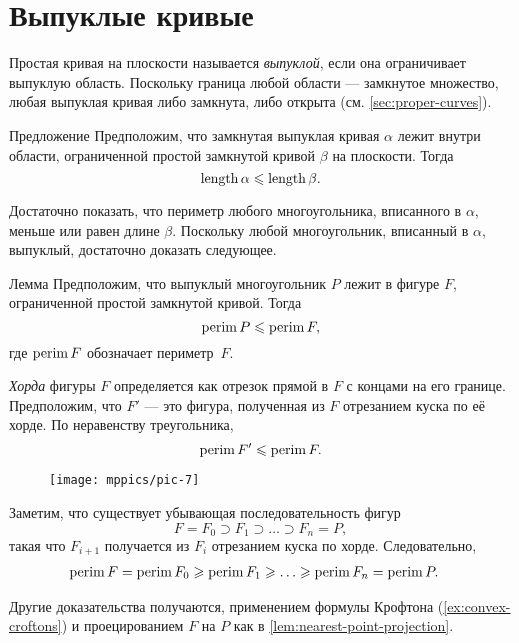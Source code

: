 \section{Выпуклые кривые}

Простая кривая на плоскости называется \emph{выпуклой}, если она ограничивает выпуклую область.
Поскольку граница любой области --- замкнутое множество, любая выпуклая кривая либо замкнута, либо открыта (см. \ref{sec:proper-curves}).

\begin{thm}{Предложение}\label{prop:convex-curve}
Предположим, что замкнутая выпуклая кривая $\alpha$ лежит внутри области, ограниченной простой замкнутой кривой $\beta$ на плоскости.
Тогда
\[\mathop{\rm length}\nolimits\alpha\leqslant \mathop{\rm length}\nolimits\beta.\]
\end{thm}

Достаточно показать, что периметр любого многоугольника, вписанного в $\alpha$, меньше или равен длине $\beta$.
Поскольку любой многоугольник, вписанный в $\alpha$, выпуклый, достаточно доказать следующее.

\begin{thm}{Лемма}\label{lem:perimeter}
Предположим, что выпуклый многоугольник $P$ лежит в фигуре $F$, ограниченной простой замкнутой кривой.
Тогда
\[\mathop{\rm perim}\nolimits P\leqslant \mathop{\rm perim}\nolimits F,\]
где $\mathop{\rm perim}\nolimits F$ обозначает периметр~$F$.
\end{thm}

\emph{Хорда} фигуры $F$ определяется как отрезок прямой в $F$ с концами на его границе.
Предположим, что $F'$ --- это фигура, полученная из $F$ отрезанием куска по её хорде.
По неравенству треугольника,
\[\mathop{\rm perim}\nolimits F'\leqslant \mathop{\rm perim}\nolimits F.\]

\begin{wrapfigure}{o}{24 mm}
\vskip-10mm
\centering
\texttt{[image: mppics/pic-7]}
\vskip3mm
\end{wrapfigure}

Заметим, что существует убывающая последовательность фигур 
\[F=F_0\supset F_1\supset\dots\supset F_n=P,\]
такая что $F_{i+1}$ получается из $F_{i}$ отрезанием куска по хорде.
Следовательно, 
\begin{align*}
\perim F=\perim F_0&\ge\perim F_1\ge\dots\ge\perim F_n=\perim P.
\end{align*}
\qedsf

Другие доказательства получаются, применением формулы Крофтона (\ref{ex:convex-croftons}) и проецированием $F$ на $P$ как в \ref{lem:nearest-point-projection}.  

